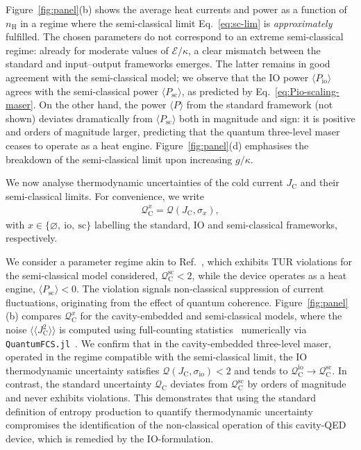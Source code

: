 \documentclass[aps,twocolumn,10pt,prl,floatfix,nofootinbib, superscriptaddress]{revtex4-2}
\begin{document}
Figure~\ref{fig:panel}(b) shows the average heat currents and power as a function of $n_\mathrm{H}$ in a regime where the semi-classical limit Eq.~\eqref{eq:sc-lim} is \textit{approximately} fulfilled.  The chosen parameters do not correspond to an extreme semi-classical regime: already for moderate values of $\mathcal{E}/\kappa$, a clear mismatch between the standard and input--output frameworks emerges. The latter remains in good agreement with the semi-classical model; we observe that the IO power $\langle P_\text{io}\rangle$ agrees with the semi-classical power $\langle P_\text{sc}\rangle$, as predicted by Eq.~\eqref{eq:Pio-scaling-maser}. On the other hand, the power $\langle P\rangle$ from the standard framework (not shown) deviates dramatically from $\langle P_\text{sc}\rangle$ both in magnitude and sign: it is positive and orders of magnitude larger, predicting that the quantum three-level maser ceases to operate as a heat engine. Figure~\ref{fig:panel}(d) emphasises the breakdown of the semi-classical limit upon increasing $g/\kappa$.


We now analyse thermodynamic uncertainties of the cold current $J_\text{C}$ and their semi-classical limits. For convenience, we write
\begin{align}
    \mathcal{Q}^x_\text{C} = \mathcal{Q}(J_\text{C},\sigma_x),
\end{align}
with $x\in\{\varnothing,~\text{io},~\text{sc}\}$ labelling the standard, IO and semi-classical frameworks, respectively.

We consider a parameter regime akin to Ref.~\cite{Kalaee_2021}, which exhibits TUR violations for the semi-classical model considered, $\mathcal{Q}^\text{sc}_\text{C}<2$, while  the device operates as a heat engine, $\langle P_\text{sc}\rangle <0$. The violation signals non-classical suppression of current fluctuations, originating from the effect of quantum coherence. Figure~\ref{fig:panel}(b) compares $\mathcal{Q}^x_\text{C}$ for the cavity-embedded and semi-classical models, where the noise $\langle\!\langle J_\text{C}^2\rangle\!\rangle$ is computed using full-counting statistics~\cite{landi_2024} numerically via \texttt{QuantumFCS.jl}~\cite{QuantumFCSjl2025}. We confirm that in the cavity-embedded three-level maser, operated in the regime compatible with the semi-classical limit, the IO thermodynamic uncertainty satisfies $\mathcal{Q}(J_\text{C},\sigma_\text{io})<2$ and tends to $\mathcal{Q}^\text{io}_\text{C}\to\mathcal{Q}^\text{sc}_\text{C}$. In contrast, the standard uncertainty $\mathcal{Q}_\text{C}$ deviates from $\mathcal{Q}^\text{sc}_\text{C}$ by orders of magnitude and never exhibits violations. This demonstrates that using the standard definition of entropy production to quantify thermodynamic uncertainty compromises the identification of the non-classical operation of this cavity-QED device, which is remedied by the IO-formulation.
\end{document}
